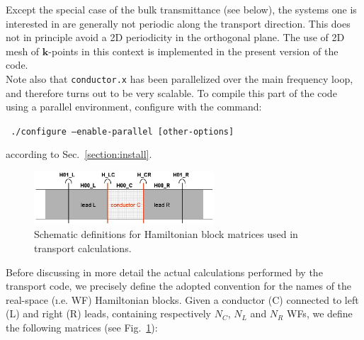 Except the special case of the bulk transmittance (see below), the systems one is
interested in are generally not periodic along the transport direction. This does not
in principle avoid a 2D periodicity in the orthogonal plane. The use of
2D mesh of $\mathbf{k}$-points in this context is implemented in the present
version of the code.  \\

Note also that \texttt{conductor.x} has been parallelized over the 
main frequency loop, and therefore turns out to be very scalable.
To compile this part of the code using a parallel environment, configure
with the command:

\texttt{ ./configure --enable-parallel [other-options]}

\noindent
according to Sec.~\ref{section:install}. 


%
%
\begin{figure}
   \centering
   \includegraphics[clip,width=0.6\textwidth]{lcr}
   \caption{Schematic definitions for Hamiltonian block matrices used in
            transport calculations. \label{fig:matrix_naming}}
\end{figure}
%
%
\noindent Before discussing in more detail the actual calculations
performed by the transport code, we precisely define the adopted
convention for the names of the real-space ({\i.e.} WF)
Hamiltonian blocks. Given a conductor (C) connected to left (L)
and right (R) leads, containing respectively $N_C$, $N_L$ and
$N_R$ WFs,
we define the following matrices (see Fig.~\ref{fig:matrix_naming}): \\

